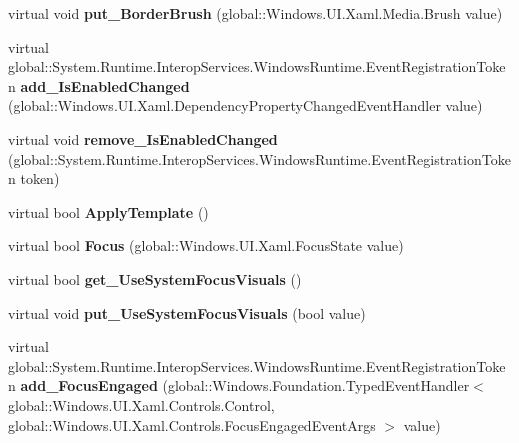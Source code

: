 \begin{DoxyCompactItemize}
virtual void {\bfseries put\+\_\+\+Border\+Brush} (global\+::\+Windows.\+U\+I.\+Xaml.\+Media.\+Brush value)
\item 
\mbox{\label{class_windows_1_1_u_i_1_1_xaml_1_1_controls_1_1_control_a825185d5afd2516710efebaeb9350f9d}} 
virtual global\+::\+System.\+Runtime.\+Interop\+Services.\+Windows\+Runtime.\+Event\+Registration\+Token {\bfseries add\+\_\+\+Is\+Enabled\+Changed} (global\+::\+Windows.\+U\+I.\+Xaml.\+Dependency\+Property\+Changed\+Event\+Handler value)
\item 
\mbox{\label{class_windows_1_1_u_i_1_1_xaml_1_1_controls_1_1_control_ae6492dba1a06b7283e52b7e05df6ba01}} 
virtual void {\bfseries remove\+\_\+\+Is\+Enabled\+Changed} (global\+::\+System.\+Runtime.\+Interop\+Services.\+Windows\+Runtime.\+Event\+Registration\+Token token)
\item 
\mbox{\label{class_windows_1_1_u_i_1_1_xaml_1_1_controls_1_1_control_acdc49d1356465906f233a94118f9fc61}} 
virtual bool {\bfseries Apply\+Template} ()
\item 
\mbox{\label{class_windows_1_1_u_i_1_1_xaml_1_1_controls_1_1_control_af09f0101a93f914e3ea713e2afd6cbc5}} 
virtual bool {\bfseries Focus} (global\+::\+Windows.\+U\+I.\+Xaml.\+Focus\+State value)
\item 
\mbox{\label{class_windows_1_1_u_i_1_1_xaml_1_1_controls_1_1_control_a1f599dcf33ab7480ed9700961d478ab9}} 
virtual bool {\bfseries get\+\_\+\+Use\+System\+Focus\+Visuals} ()
\item 
\mbox{\label{class_windows_1_1_u_i_1_1_xaml_1_1_controls_1_1_control_a47ca9e1b055dc27a0c37edbc47e2540d}} 
virtual void {\bfseries put\+\_\+\+Use\+System\+Focus\+Visuals} (bool value)
\item 
\mbox{\label{class_windows_1_1_u_i_1_1_xaml_1_1_controls_1_1_control_a25b5c6642d47212aa2e63ff6200ac1c7}} 
virtual global\+::\+System.\+Runtime.\+Interop\+Services.\+Windows\+Runtime.\+Event\+Registration\+Token {\bfseries add\+\_\+\+Focus\+Engaged} (global\+::\+Windows.\+Foundation.\+Typed\+Event\+Handler$<$ global\+::\+Windows.\+U\+I.\+Xaml.\+Controls.\+Control, global\+::\+Windows.\+U\+I.\+Xaml.\+Controls.\+Focus\+Engaged\+Event\+Args $>$ value)

\end{DoxyCompactItemize}
